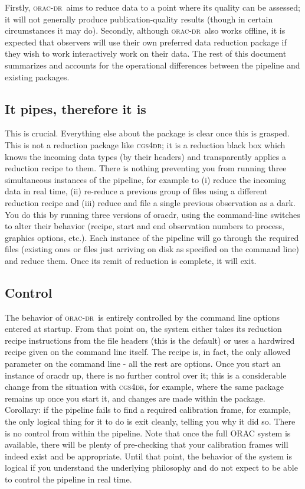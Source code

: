 \documentclass[twoside,11pt]{article}
\newcommand{\xref}[3]{#1}
\renewcommand{\_}{\texttt{\symbol{95}}}
\newcommand{\oracdr}{\textsc{orac-dr}}
\newcommand{\cgsdr}{\xref{{\textsc{cgs4dr}}}{sun27}{}}
\begin{document}
Firstly, \oracdr\ aims to reduce data to a point where its quality can
be assessed; it will not generally produce publication-quality results
(though in certain circumstances it may do).  Secondly, although
\oracdr\ also works offline, it is expected that observers will use
their own preferred data reduction package if they wish to work
interactively work on their data. The rest of this document summarizes
and accounts for the operational differences between the pipeline and
existing packages.

\subsection*{It pipes, therefore it is\label{Introduction_to_ORAC-DR_It_pipes_therefore_it_is}}

This is crucial. Everything else about the package is clear once this
is grasped. This is not a reduction package like \cgsdr; it is a
reduction black box which knows the incoming data types (by their
headers) and transparently applies a reduction recipe to them. There
is nothing preventing you from running three simultaneous instances of
the pipeline, for example to (i) reduce the incoming data in real
time, (ii) re-reduce a previous group of files using a different
reduction recipe and (iii) reduce and file a single previous
observation as a dark. You do this by running three versions of
oracdr, using the command-line switches to alter their behavior
(recipe, start and end observation numbers to process, graphics
options, etc.). Each instance of the pipeline will go through the
required files (existing ones or files just arriving on disk as
specified on the command line) and reduce them. Once its remit of
reduction is complete, it will exit.

\subsection*{Control\label{Introduction_to_ORAC-DR_Control}}

The behavior of \oracdr\ is entirely controlled by the command line
options entered at startup. From that point on, the system either
takes its reduction recipe instructions from the file headers (this is
the default) or uses a hardwired recipe given on the command line
itself. The recipe is, in fact, the only allowed parameter on the
command line - all the rest are options. Once you start an instance of
oracdr up, there is no further control over it; this is a considerable
change from the situation with \cgsdr, for example, where the same
package remains up once you start it, and changes are made within the
package. Corollary: if the pipeline fails to find a required
calibration frame, for example, the only logical thing for it to do is
exit cleanly, telling you why it did so. There is no control from
within the pipeline. Note that once the full ORAC system is available,
there will be plenty of pre-checking that your calibration frames will
indeed exist and be appropriate. Until that point, the behavior of
the system is logical if you understand the underlying philosophy and
do not expect to be able to control the pipeline in real time.
\end{document}
